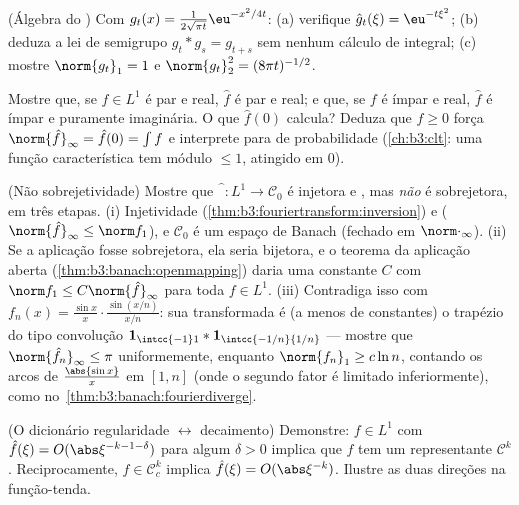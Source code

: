 \begin{exercise}[$\star\star$]\label{exo:b3:fouriertransform:4}
(Álgebra do ) Com $g_t(x) =
\frac1{2\sqrt{\pi t}}\eu^{-x^2/4t}$:
(a) verifique $\hat g_t(\xi) = \eu^{-t\xi^2}$;
(b) deduza a lei de semigrupo $g_t * g_s = g_{t+s}$ sem nenhum cálculo de integral;
(c) mostre $\norm{g_t}_1 = 1$ e $\norm{g_t}_2^2 =
(8\pi t)^{-1/2}$.
\end{exercise}

\begin{exercise}[$\star\star$]\label{exo:b3:fouriertransform:5}
Mostre que, se $f \in L^1$ é par e real, $\hat f$ é par e real; e que, se
$f$ é ímpar e real, $\hat f$ é ímpar e puramente imaginária. O
que $\hat f(0)$ calcula? Deduza que $f \geq
0$ força $\norm{\hat f}_\infty = \hat f(0) = \int f$ e interprete para
 de probabilidade (\cref{ch:b3:clt}: uma função característica
tem módulo $\leq 1$, atingido em $0$).
\end{exercise}

\begin{exercise}[$\star\star\star$]\label{exo:b3:fouriertransform:6}
(Não sobrejetividade) Mostre que $\widehat{\phantom f}\colon L^1
\to \mathcal C_0$ é injetora e , mas
\emph{não} é sobrejetora, em três etapas.
(i) Injetividade (\cref{thm:b3:fouriertransform:inversion}) e  ($\norm{\hat f}_\infty \leq \norm f_1$), e $\mathcal C_0$ é um
espaço de Banach (fechado em $\norm\cdot_\infty$).
(ii) Se a aplicação fosse sobrejetora, ela seria bijetora, e o teorema
da aplicação aberta (\cref{thm:b3:banach:openmapping}) daria uma constante $C$ com
$\norm f_1 \leq C\norm{\hat
f}_\infty$ para toda $f \in L^1$.
(iii) Contradiga isso com $f_n(x) = \frac{\sin
x}{x}\cdot\frac{\sin(x/n)}{x/n}$: sua transformada é (a menos de
constantes) o trapézio do tipo convolução $\mathbf 1_{\intcc{-1}1} *
\mathbf 1_{\intcc{-1/n}{1/n}}$ --- mostre que $\norm{\hat f_n}_\infty \leq \pi$
uniformemente, enquanto $\norm{f_n}_1 \geq c\ln n$, contando os arcos de $\frac{\abs{\sin x}}x$ em $[1, n]$
(onde o segundo fator é limitado inferiormente), como
no~\cref{thm:b3:banach:fourierdiverge}.
\end{exercise}

\begin{exercise}[$\star\star$]\label{exo:b3:fouriertransform:7}
(O dicionário regularidade $\leftrightarrow$ decaimento) Demonstre: $f \in
L^1$ com $\hat f(\xi) = O(\abs\xi^{-k-1-\delta})$
para algum $\delta > 0$ implica que $f$ tem um representante $\mathcal C^k$.
Reciprocamente, $f \in \mathcal C^k_c$ implica $\hat f(\xi) =
O(\abs\xi^{-k})$. Ilustre as duas direções na
função-tenda.
\end{exercise}

